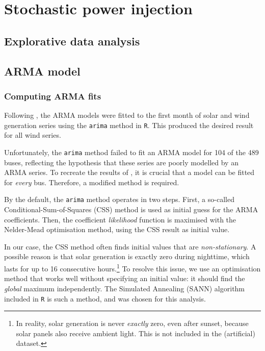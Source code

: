 \documentclass[main.tex]{subfiles}
\begin{document}
\section{Stochastic power injection}
\subsection{Explorative data analysis}
\subsection{ARMA model}

\subsubsection{Computing ARMA fits}\label{arimamod}
Following \cite{Nesti2018emergentfailures}, the ARMA models were fitted to the first month of solar and wind generation series using the \texttt{arima} method in \texttt{R}. This produced the desired result for all wind series.

Unfortunately, the \texttt{arima} method failed to fit an ARMA model for 104 of the 489 buses, reflecting the hypothesis that these series are poorly modelled by an ARMA series. To recreate the results of \cite{Nesti2018emergentfailures}, it is crucial that a model can be fitted for \emph{every} bus. Therefore, a modified method is required.

By the default, the \texttt{arima} method operates in two steps. First, a so-called Conditional-Sum-of-Squares (CSS) method is used as initial guess for the ARMA coefficients. Then, the coefficient \emph{likelihood} function is maximised with the Nelder-Mead optimisation method, using the CSS result as initial value.

In our case, the CSS method often finds initial values that are \emph{non-stationary}. A possible reason is that solar generation is exactly zero during nighttime, which lasts for up to 16 consecutive hours.\footnote{In reality, solar generation is never \emph{exactly} zero, even after sunset, because solar panels also receive ambient light. This is not included in the (artificial) dataset.
}
To resolve this issue, we use an optimisation method that works well without specifying an initial value: it should find the \emph{global} maximum independently. The Simulated Annealing (SANN) algorithm included in \texttt{R} is such a method, and was chosen for this analysis.
\end{document}
